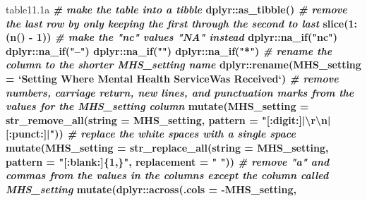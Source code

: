 \documentclass[
]{article}
\newenvironment{Shaded}{\begin{snugshade}}{\end{snugshade}}
\newcommand{\CharTok}[1]{\textcolor[rgb]{0.31,0.60,0.02}{#1}}
\newcommand{\CommentTok}[1]{\textcolor[rgb]{0.56,0.35,0.01}{\textit{#1}}}
\newcommand{\DataTypeTok}[1]{\textcolor[rgb]{0.13,0.29,0.53}{#1}}
\newcommand{\DecValTok}[1]{\textcolor[rgb]{0.00,0.00,0.81}{#1}}
\newcommand{\FloatTok}[1]{\textcolor[rgb]{0.00,0.00,0.81}{#1}}
\newcommand{\KeywordTok}[1]{\textcolor[rgb]{0.13,0.29,0.53}{\textbf{#1}}}
\newcommand{\NormalTok}[1]{#1}
\newcommand{\OperatorTok}[1]{\textcolor[rgb]{0.81,0.36,0.00}{\textbf{#1}}}
\newcommand{\StringTok}[1]{\textcolor[rgb]{0.31,0.60,0.02}{#1}}
\begin{document}
\begin{Shaded}
\begin{Highlighting}[]
\NormalTok{table11}\FloatTok{.1}\NormalTok{a }\OperatorTok{%<>%}
\CommentTok{# make the table into a tibble}
\StringTok{  }\NormalTok{dplyr}\OperatorTok{::}\KeywordTok{as_tibble}\NormalTok{() }\OperatorTok{%>%}
\CommentTok{# remove the last row by only keeping the first through the second to last}
\StringTok{  }\KeywordTok{slice}\NormalTok{(}\DecValTok{1}\OperatorTok{:}\NormalTok{(}\KeywordTok{n}\NormalTok{() }\OperatorTok{-}\StringTok{ }\DecValTok{1}\NormalTok{)) }\OperatorTok{%>%}
\CommentTok{# make the "nc" values "NA" instead}
\StringTok{  }\NormalTok{dplyr}\OperatorTok{::}\KeywordTok{na_if}\NormalTok{(}\StringTok{"nc"}\NormalTok{) }\OperatorTok{%>%}
\StringTok{  }\NormalTok{dplyr}\OperatorTok{::}\KeywordTok{na_if}\NormalTok{(}\StringTok{"--"}\NormalTok{) }\OperatorTok{%>%}
\StringTok{  }\NormalTok{dplyr}\OperatorTok{::}\KeywordTok{na_if}\NormalTok{(}\StringTok{""}\NormalTok{) }\OperatorTok{%>%}
\StringTok{  }\NormalTok{dplyr}\OperatorTok{::}\KeywordTok{na_if}\NormalTok{(}\StringTok{"*"}\NormalTok{) }\OperatorTok{%>%}\StringTok{ }
\CommentTok{# rename the column to the shorter MHS_setting name}
\StringTok{  }\NormalTok{dplyr}\OperatorTok{::}\KeywordTok{rename}\NormalTok{(}\DataTypeTok{MHS_setting =} 
                  \StringTok{`}\DataTypeTok{Setting Where Mental Health ServiceWas Received}\StringTok{`}\NormalTok{) }\OperatorTok{%>%}
\CommentTok{# remove numbers, carriage return, new lines, and punctuation marks from the values for the MHS_setting column}
\StringTok{  }\KeywordTok{mutate}\NormalTok{(}\DataTypeTok{MHS_setting =} 
         \KeywordTok{str_remove_all}\NormalTok{(}\DataTypeTok{string =}\NormalTok{ MHS_setting, }
                       \DataTypeTok{pattern =} \StringTok{"[:digit:]|}\CharTok{\textbackslash{}r\textbackslash{}n}\StringTok{|[:punct:]|"}\NormalTok{)) }\OperatorTok{%>%}
\CommentTok{# replace the white spaces with a single space}
\StringTok{  }\KeywordTok{mutate}\NormalTok{(}\DataTypeTok{MHS_setting =} 
         \KeywordTok{str_replace_all}\NormalTok{(}\DataTypeTok{string =}\NormalTok{ MHS_setting,}
                        \DataTypeTok{pattern =} \StringTok{"[:blank:]\{1,\}"}\NormalTok{, }
                    \DataTypeTok{replacement =} \StringTok{" "}\NormalTok{)) }\OperatorTok{%>%}
\CommentTok{# remove "a" and commas from the values in the columns except the column called MHS_setting}
\StringTok{  }\KeywordTok{mutate}\NormalTok{(dplyr}\OperatorTok{::}\KeywordTok{across}\NormalTok{(}\DataTypeTok{.cols =} \OperatorTok{-}\NormalTok{MHS_setting,}
}}}}}}}}}}
\end{Highlighting}
\end{Shaded}
\end{document}

